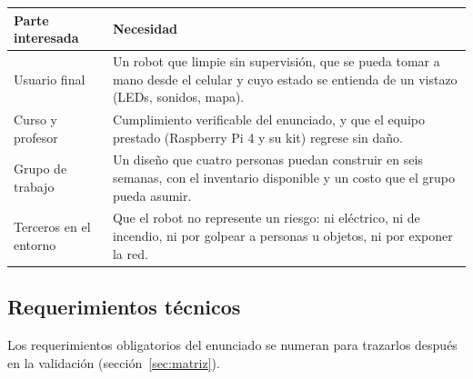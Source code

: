 \documentclass[11pt,a4paper]{article}
\begin{document}
\begin{center}
\begin{tabularx}{\linewidth}{L{3.1cm}Y}
\toprule
\textbf{Parte interesada} & \textbf{Necesidad} \\
\midrule
Usuario final & Un robot que limpie sin supervisión, que se pueda tomar a
mano desde el celular y cuyo estado se entienda de un vistazo (LEDs, sonidos,
mapa). \\
Curso y profesor & Cumplimiento verificable del enunciado, y que el equipo
prestado (Raspberry Pi 4 y su kit) regrese sin daño. \\
Grupo de trabajo & Un diseño que cuatro personas puedan construir en seis
semanas, con el inventario disponible y un costo que el grupo pueda asumir. \\
Terceros en el entorno & Que el robot no represente un riesgo: ni eléctrico,
ni de incendio, ni por golpear a personas u objetos, ni por exponer la red. \\
\bottomrule
\end{tabularx}
\end{center}

\subsection{Requerimientos técnicos}

Los requerimientos obligatorios del enunciado se numeran para trazarlos
después en la validación (sección~\ref{sec:matriz}).
\end{document}
